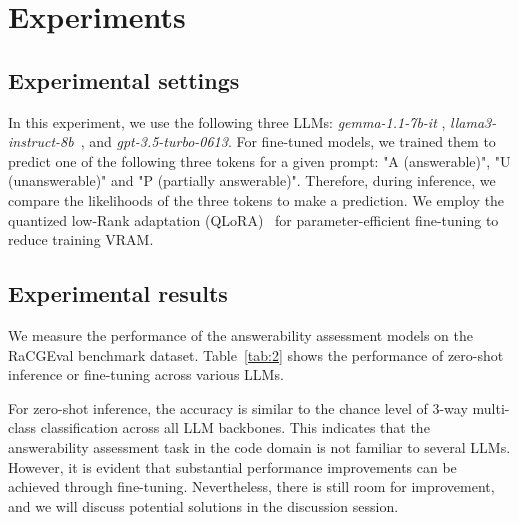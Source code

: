 

\section{Experiments}
\subsection{Experimental settings}
In this experiment, we use the following three LLMs: \textit{gemma-1.1-7b-it} \cite{team2024gemma}, \textit{llama3-instruct-8b}~\cite{dubey2024llama3herdmodels}, and \textit{gpt-3.5-turbo-0613}. For fine-tuned models, we trained them to predict one of the following three tokens for a given prompt: "A (answerable)", "U (unanswerable)" and "P (partially answerable)". Therefore, during inference, we compare the likelihoods of the three tokens to make a prediction. We employ the quantized low-Rank adaptation (QLoRA)~\cite{tim2024qlora} for parameter-efficient fine-tuning to reduce training VRAM.

\subsection{Experimental results}
We measure the performance of the answerability assessment models on the RaCGEval benchmark dataset. Table~\ref{tab:2} shows the performance of zero-shot inference or fine-tuning across various LLMs.

For zero-shot inference, the accuracy is similar to the chance level of 3-way multi-class classification across all LLM backbones. This indicates that the answerability assessment task in the code domain is not familiar to several LLMs. However, it is evident that substantial performance improvements can be achieved through fine-tuning. Nevertheless, there is still room for improvement, and we will discuss potential solutions in the discussion session.